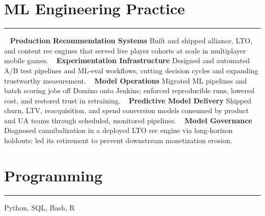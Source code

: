 %
%

\vspace{-1.0cm}
\section{\LARGE ML Engineering Practice}
\noindent\rule{\textwidth}{0.4pt}
\vspace{-0.2cm}
~
\textbf{\large Production Recommendation Systems}
\faGem Built and shipped alliance, LTO, and content rec engines that served live player cohorts at scale in multiplayer mobile games.
~
\textbf{\large Experimentation Infrastructure}
\faGem Designed and automated A/B test pipelines and ML-eval workflows, cutting decision cycles and expanding trustworthy measurement.
~
\textbf{\large Model Operations}
\faGem Migrated ML pipelines and batch scoring jobs off Domino onto Jenkins; enforced reproducible runs, lowered cost, and restored trust in retraining.
~
\textbf{\large Predictive Model Delivery}
\faGem Shipped churn, LTV, reacquisition, and spend conversion models consumed by product and UA teams through scheduled, monitored pipelines.
~
\textbf{\large Model Governance}
\faGem Diagnosed cannibalization in a deployed LTO rec engine via long-horizon holdouts; led its retirement to prevent downstream monetization erosion.
\section{\LARGE Programming}
\noindent\rule{\textwidth}{0.4pt}
Python, SQL, Bash, R
